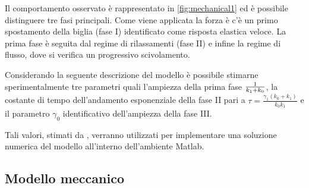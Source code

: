 Il comportamento osservato è rappresentato in \cref{fig:mechanical1} ed è possibile distinguere tre fasi principali. Come viene applicata la forza è c'è un primo spostamento della biglia (fase I) identificato come risposta elastica veloce. La prima fase è seguita dal regime di rilassamenti (fase II) e infine la regime di flusso, dove si verifica un progressivo scivolamento.

Considerando la seguente descrizione del modello è possibile stimarne sperimentalmente tre parametri quali l'ampiezza della prima fase $1\over k_1+k_0$, la costante di tempo dell'andamento esponenziale della fase II pari a  $\tau=\frac{\gamma_{1}\left(k_{0}+k_{1}\right)}{k_{0} k_{1}}$ e il parametro $\gamma_0$ identificativo dell'ampiezza della fase III. 

Tali valori, stimati da \citeauthor{bausch_local_1998} \cite{bausch_local_1998}, verranno utilizzati per implementare una soluzione numerica del modello all'interno dell'ambiente Matlab.



\subsection{Modello meccanico}

